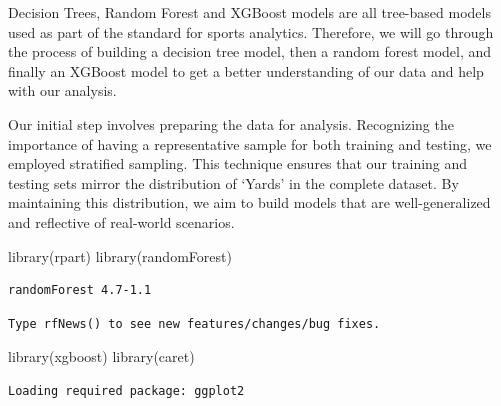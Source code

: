 \documentclass[
  super,
  preprint,
  3p]{elsarticle}
\newenvironment{Shaded}{\begin{snugshade}}{\end{snugshade}}
\newcommand{\CommentTok}[1]{\textcolor[rgb]{0.37,0.37,0.37}{#1}}
\newcommand{\DecValTok}[1]{\textcolor[rgb]{0.68,0.00,0.00}{#1}}
\newcommand{\FunctionTok}[1]{\textcolor[rgb]{0.28,0.35,0.67}{#1}}
\newcommand{\NormalTok}[1]{\textcolor[rgb]{0.00,0.23,0.31}{#1}}
\newcommand{\OtherTok}[1]{\textcolor[rgb]{0.00,0.23,0.31}{#1}}
\newcommand{\SpecialCharTok}[1]{\textcolor[rgb]{0.37,0.37,0.37}{#1}}
\begin{document}
\begin{Shaded}
\end{Shaded}

Decision Trees, Random Forest and XGBoost models are all tree-based
models used as part of the standard for sports analytics. Therefore, we
will go through the process of building a decision tree model, then a
random forest model, and finally an XGBoost model to get a better
understanding of our data and help with our analysis.

Our initial step involves preparing the data for analysis. Recognizing
the importance of having a representative sample for both training and
testing, we employed stratified sampling. This technique ensures that
our training and testing sets mirror the distribution of `Yards' in the
complete dataset. By maintaining this distribution, we aim to build
models that are well-generalized and reflective of real-world scenarios.

\begin{Shaded}
\begin{Highlighting}[]
\FunctionTok{library}\NormalTok{(rpart)}
\FunctionTok{library}\NormalTok{(randomForest)}
\end{Highlighting}
\end{Shaded}

\begin{verbatim}
randomForest 4.7-1.1
\end{verbatim}

\begin{verbatim}
Type rfNews() to see new features/changes/bug fixes.
\end{verbatim}

\begin{Shaded}
\begin{Highlighting}[]
\FunctionTok{library}\NormalTok{(xgboost)}
\FunctionTok{library}\NormalTok{(caret)}
\end{Highlighting}
\end{Shaded}

\begin{verbatim}
Loading required package: ggplot2
\end{verbatim}
\end{document}

